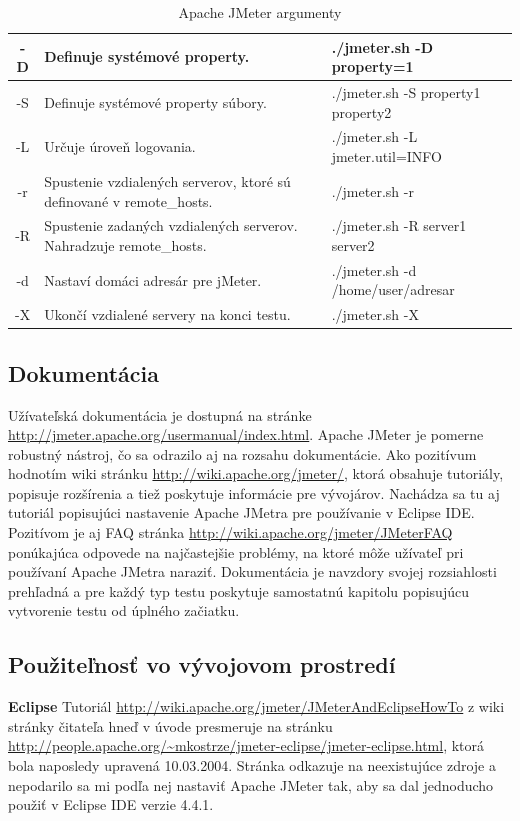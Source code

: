\documentclass[12pt,oneside,final]{fithesis-utf8}
\begin{document}
\begin{table}[h!]
\begin{center}
\begin{tabular}{| c | p{8cm} | p{5cm} |}
	-D & Definuje systémové property. & ./jmeter.sh -D property=1 \\ \hline
	-S & Definuje systémové property súbory. & ./jmeter.sh -S property1 property2 \\ \hline
	-L & Určuje úroveň logovania. & ./jmeter.sh -L jmeter.util=INFO \\ \hline
	-r & Spustenie vzdialených serverov, ktoré sú definované v remote\_{}hosts. & ./jmeter.sh -r \\ \hline
	-R & Spustenie zadaných vzdialených serverov. Nahradzuje remote\_{}hosts. & ./jmeter.sh -R server1 server2 \\ \hline
	-d & Nastaví domáci adresár pre jMeter. & ./jmeter.sh -d /home/user/adresar \\ \hline
	-X & Ukončí vzdialené servery na konci testu. & ./jmeter.sh -X \\ \hline
	

\end{tabular}
\end{center}
\caption{Apache JMeter argumenty}
\end{table}

\newpage
\subsection{Dokumentácia}
Užívateľská dokumentácia je dostupná na stránke \url{http://jmeter.apache.org/usermanual/index.html}. Apache JMeter je pomerne robustný nástroj, čo sa odrazilo aj na rozsahu dokumentácie. Ako pozitívum hodnotím wiki stránku \url{http://wiki.apache.org/jmeter/}, ktorá obsahuje tutoriály, popisuje rozšírenia a tiež poskytuje informácie pre vývojárov. Nachádza sa tu aj tutoriál popisujúci nastavenie Apache JMetra pre používanie v Eclipse IDE. Pozitívom je aj FAQ stránka \url{http://wiki.apache.org/jmeter/JMeterFAQ} ponúkajúca odpovede na najčastejšie problémy, na ktoré môže užívateľ pri používaní Apache JMetra naraziť. Dokumentácia je navzdory svojej rozsiahlosti prehľadná a pre každý typ testu poskytuje samostatnú kapitolu popisujúcu vytvorenie testu od úplného začiatku.

\subsection{Použiteľnosť vo vývojovom prostredí}
\textbf{Eclipse}
\newline
Tutoriál \url{http://wiki.apache.org/jmeter/JMeterAndEclipseHowTo} z wiki stránky  čitateľa hneď v úvode presmeruje na stránku \url{http://people.apache.org/~mkostrze/jmeter-eclipse/jmeter-eclipse.html}, ktorá bola naposledy upravená 10.03.2004. Stránka odkazuje na neexistujúce zdroje a nepodarilo sa mi podľa nej nastaviť Apache JMeter tak, aby sa dal jednoducho použiť v Eclipse IDE verzie 4.4.1.
\newline
\end{document}
